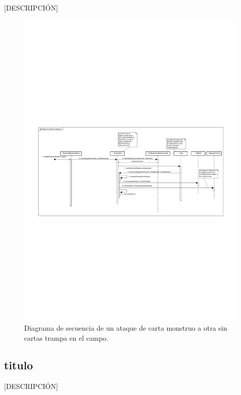 [DESCRIPCIÓN]

\begin{figure}[H]
	\centering
	\includegraphics[scale=0.9]{includes/seq_Ataque_de_carta_sin_trampas}
	\caption{Diagrama de secuencia de un ataque de carta monstruo a otra sin cartas trampa en el campo.}
	\label{seq_Ataque_de_carta_sin_trampas}
\end{figure}


\subsection{titulo}

[DESCRIPCIÓN]


